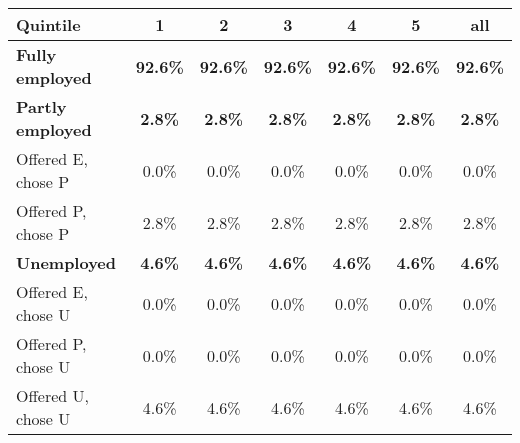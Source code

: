 \begin{center}
\begin{adjustbox}{width=\textwidth}
\begin{tabular}{lcccccc}\toprule
Quintile & 1 & 2 & 3 & 4 & 5 & all \\
\midrule
\textbf{Fully employed} & \textbf{92.6\%} & \textbf{92.6\%} & \textbf{92.6\%} & \textbf{92.6\%} & \textbf{92.6\%} & \textbf{92.6\%} \\
\textbf{Partly employed} & \textbf{2.8\%} & \textbf{2.8\%} & \textbf{2.8\%} & \textbf{2.8\%} & \textbf{2.8\%} & \textbf{2.8\%} \\
\;\;Offered E, chose P & 0.0\% & 0.0\% & 0.0\% & 0.0\% & 0.0\% & 0.0\% \\
\;\;Offered P, chose P & 2.8\% & 2.8\% & 2.8\% & 2.8\% & 2.8\% & 2.8\% \\
\textbf{Unemployed} & \textbf{4.6\%} & \textbf{4.6\%} & \textbf{4.6\%} & \textbf{4.6\%} & \textbf{4.6\%} & \textbf{4.6\%} \\
\;\;Offered E, chose U & 0.0\% & 0.0\% & 0.0\% & 0.0\% & 0.0\% & 0.0\% \\
\;\;Offered P, chose U & 0.0\% & 0.0\% & 0.0\% & 0.0\% & 0.0\% & 0.0\% \\
\;\;Offered U, chose U & 4.6\% & 4.6\% & 4.6\% & 4.6\% & 4.6\% & 4.6\% \\
\bottomrule\end{tabular}
\end{adjustbox}
\end{center}